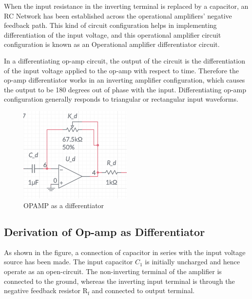 When the input resistance in the inverting terminal is replaced by a capacitor, an RC Network has been established across the operational amplifiers’ negative feedback path. This kind of circuit configuration helps in implementing differentiation of the input voltage, and this operational amplifier circuit configuration is known as an Operational amplifier differentiator circuit.

In a differentiating op-amp circuit, the output of the circuit is the differentiation of the input voltage applied to the op-amp with respect to time. Therefore the op-amp differentiator works in an inverting amplifier configuration, which causes the output to be 180 degrees out of phase with the input. Differentiating op-amp configuration generally responds to triangular or rectangular input waveforms.

\begin{figure}[H]
	\includegraphics[width = 0.5\textwidth]{opam as differencit.png}
	\caption{OPAMP as a differentiator}
\end{figure}

\subsection{Derivation of Op-amp as Differentiator}
As shown in the figure, a connection of capacitor in series with the input voltage source has been made. The input capacitor $C_{1}$ is initially uncharged and hence operate as an open-circuit. The non-inverting terminal of the amplifier is connected to the ground, whereas the inverting input terminal is through the negative feedback resistor $\mathrm{R}_{\mathrm{f}}$ and connected to output terminal.


